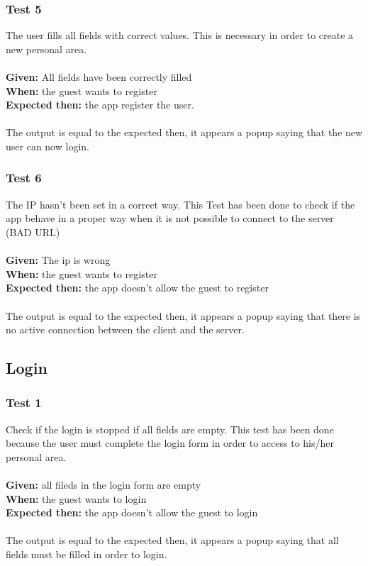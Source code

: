 \subsubsection{\Large{Test 5}}
The user fills all fields with correct values. This is necessary in order to create a new personal area.\\
\\
\textbf{Given: } All fields have been correctly filled\\
\textbf{When: } the guest wants to register\\
\textbf{Expected then: } the app register the user.\\
\\
The output is equal to the expected then, it appears a popup saying that the new user can now login.

\subsubsection{\Large{Test 6}}
The IP hasn't been set in a correct way. This Test has been done to check if the app behave in a proper way when it is not possible to connect to the server (BAD URL)\\
\\
\textbf{Given: } The ip is wrong\\
\textbf{When: } the guest wants to register\\
\textbf{Expected then: } the app doesn't allow the guest to register\\
\\
The output is equal to the expected then, it appears a popup saying that there is no active connection between the client and the server.

\subsection{Login}
\subsubsection{\Large{Test 1}}
Check if the login is stopped if all fields are empty. This test has been done because the user must complete the login form in order to access to his/her personal area.\\
\\
\textbf{Given: } all fileds in the login form are empty\\
\textbf{When: } the guest wants to login\\
\textbf{Expected then: } the app doesn't allow the guest to login\\
\\
The output is equal to the expected then, it appears a popup saying that all fields must be filled in order to login.


